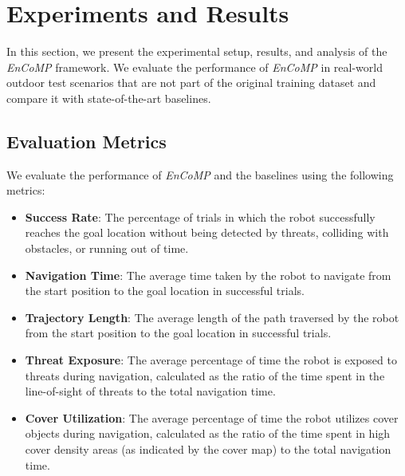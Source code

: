 \section{Experiments and Results}
\label{sec:experiments}
In this section, we present the experimental setup, results, and analysis of the \textit{EnCoMP} framework. We evaluate the performance of \textit{EnCoMP} in real-world outdoor test scenarios that are not part of the original training dataset and compare it with state-of-the-art baselines.


\subsection{Evaluation Metrics}
We evaluate the performance of \textit{EnCoMP} and the baselines using the following metrics:

\begin{itemize}
\item \textbf{Success Rate}: The percentage of trials in which the robot successfully reaches the goal location without being detected by threats, colliding with obstacles, or running out of time.
\item \textbf{Navigation Time}: The average time taken by the robot to navigate from the start position to the goal location in successful trials.
\item \textbf{Trajectory Length}: The average length of the path traversed by the robot from the start position to the goal location in successful trials.

\item \textbf{Threat Exposure}: The average percentage of time the robot is exposed to threats during navigation, calculated as the ratio of the time spent in the line-of-sight of threats to the total navigation time.
\item \textbf{Cover Utilization}: The average percentage of time the robot utilizes cover objects during navigation, calculated as the ratio of the time spent in high cover density areas (as indicated by the cover map) to the total navigation time.
\end{itemize}



